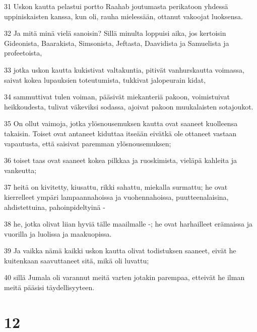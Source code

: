 \par 31 Uskon kautta pelastui portto Raahab joutumasta perikatoon yhdessä uppiniskaisten kanssa, kun oli, rauha mielessään, ottanut vakoojat luoksensa.
\par 32 Ja mitä minä vielä sanoisin? Sillä minulta loppuisi aika, jos kertoisin Gideonista, Baarakista, Simsonista, Jeftasta, Daavidista ja Samuelista ja profeetoista,
\par 33 jotka uskon kautta kukistivat valtakuntia, pitivät vanhurskautta voimassa, saivat kokea lupauksien toteutumista, tukkivat jalopeurain kidat,
\par 34 sammuttivat tulen voiman, pääsivät miekanteriä pakoon, voimistuivat heikkoudesta, tulivat väkeviksi sodassa, ajoivat pakoon muukalaisten sotajoukot.
\par 35 On ollut vaimoja, jotka ylösnousemuksen kautta ovat saaneet kuolleensa takaisin. Toiset ovat antaneet kiduttaa itseään eivätkä ole ottaneet vastaan vapautusta, että saisivat paremman ylösnousemuksen;
\par 36 toiset taas ovat saaneet kokea pilkkaa ja ruoskimista, vieläpä kahleita ja vankeutta;
\par 37 heitä on kivitetty, kiusattu, rikki sahattu, miekalla surmattu; he ovat kierrelleet ympäri lampaannahoissa ja vuohennahoissa, puutteenalaisina, ahdistettuina, pahoinpideltyinä -
\par 38 he, jotka olivat liian hyviä tälle maailmalle -; he ovat harhailleet erämaissa ja vuorilla ja luolissa ja maakuopissa.
\par 39 Ja vaikka nämä kaikki uskon kautta olivat todistuksen saaneet, eivät he kuitenkaan saavuttaneet sitä, mikä oli luvattu;
\par 40 sillä Jumala oli varannut meitä varten jotakin parempaa, etteivät he ilman meitä pääsisi täydellisyyteen.

\chapter{12}

